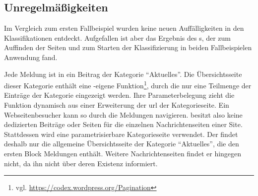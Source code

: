 \subsection{Unregelmäßigkeiten}
    Im Vergleich zum ersten Fallbeispiel
    wurden keine neuen Auffälligkeiten in den Klassifikationen entdeckt.
    Aufgefallen ist aber das Ergebnis des {\wordpressCrawler}s,
    der zum Auffinden der Seiten und zum Starten der Klassifizierung
    in beiden Fallbeispielen Anwendung fand.   

    Jede Meldung ist in {\wordpress} ein Beitrag der Kategorie "`Aktuelles"'.
    Die Übersichtsseite dieser Kategorie enthält eine {\wordpress}-eigene
    Funktion\footnote{vgl. \url{https://codex.wordpress.org/Pagination}},
    durch die nur eine Teilmenge der Einträge der Kategorie eingezeigt werden.
    Ihre Parameterbelegung zieht die Funktion dynamisch aus einer Erweiterung der
    \gls{url} der Kategorieseite.
    Ein Webseitenbesucher kann so durch die Meldungen navigieren.
    {\wordpress} besitzt also keine dedizierten Beiträge oder Seiten
    für die einzelnen Nachrichtenseiten einer Site.
    Stattdessen wird eine parametrisierbare Kategorieseite verwendet.
    Der {\wordpressCrawler} findet deshalb nur die allgemeine Übersichtsseite der Kategorie "`Aktuelles"',
    die den ersten Block Meldungen enthält.
    Weitere Nachrichtenseiten findet er hingegen nicht,
    da {\wordpress} ihn nicht über deren Existenz informiert.
